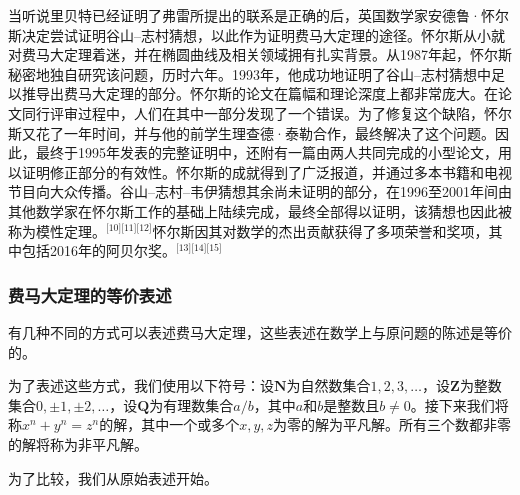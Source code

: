 当听说里贝特已经证明了弗雷所提出的联系是正确的后，英国数学家安德鲁·怀尔斯决定尝试证明谷山–志村猜想，以此作为证明费马大定理的途径。怀尔斯从小就对费马大定理着迷，并在椭圆曲线及相关领域拥有扎实背景。从1987年起，怀尔斯秘密地独自研究该问题，历时六年。1993年，他成功地证明了谷山–志村猜想中足以推导出费马大定理的部分。怀尔斯的论文在篇幅和理论深度上都非常庞大。在论文同行评审过程中，人们在其中一部分发现了一个错误。为了修复这个缺陷，怀尔斯又花了一年时间，并与他的前学生理查德·泰勒合作，最终解决了这个问题。因此，最终于1995年发表的完整证明中，还附有一篇由两人共同完成的小型论文，用以证明修正部分的有效性。怀尔斯的成就得到了广泛报道，并通过多本书籍和电视节目向大众传播。谷山–志村–韦伊猜想其余尚未证明的部分，在1996至2001年间由其他数学家在怀尔斯工作的基础上陆续完成，最终全部得以证明，该猜想也因此被称为模性定理。\(^\text{[10][11][12]}\)怀尔斯因其对数学的杰出贡献获得了多项荣誉和奖项，其中包括2016年的阿贝尔奖。\(^\text{[13][14][15]}\)
\subsubsection{费马大定理的等价表述}
有几种不同的方式可以表述费马大定理，这些表述在数学上与原问题的陈述是等价的。

为了表述这些方式，我们使用以下符号：设\( \mathbf{N} \)为自然数集合\( 1, 2, 3, \dots \)，设\( \mathbf{Z} \)为整数集合\( 0, \pm 1, \pm 2, \dots \)，设\( \mathbf{Q} \)为有理数集合\(a/b\)，其中\( a \)和\( b \)是整数且\( b \neq 0 \)。接下来我们将称\( x^n + y^n = z^n \)的解，其中一个或多个\( x, y, z \)为零的解为平凡解。所有三个数都非零的解将称为非平凡解。

为了比较，我们从原始表述开始。

